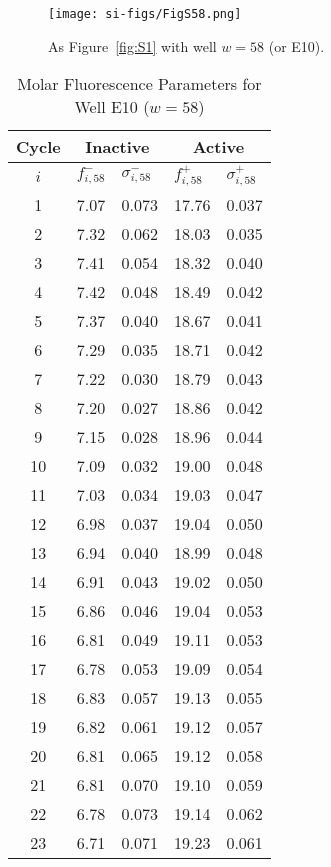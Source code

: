                 \begin{figure}
                    \centering
                    \texttt{[image: si-figs/FigS58.png]}
                    \caption{
                        As Figure~\ref{fig:S1} with well $w=58$ (or E10).
                    }
                \end{figure}
                \clearpage
    \begin{table}
        \caption{Molar Fluorescence Parameters for Well E10 ($w=58$)}
        \centering
        \begin{tabular}{c|ll|ll}
            Cycle & \multicolumn{2}{c|}{Inactive} & \multicolumn{2}{c}{Active} \\
            \hline
            $i$ & $f_{i,58}^{-}$ & $\sigma_{i,58}^{-}$ &  $f_{i,58}^{+}$ & $\sigma_{i,58}^{+}$ \\
            \hline
    1 & 7.07 & 0.073 & 17.76 & 0.037 \\
2 & 7.32 & 0.062 & 18.03 & 0.035 \\
3 & 7.41 & 0.054 & 18.32 & 0.040 \\
4 & 7.42 & 0.048 & 18.49 & 0.042 \\
5 & 7.37 & 0.040 & 18.67 & 0.041 \\
6 & 7.29 & 0.035 & 18.71 & 0.042 \\
7 & 7.22 & 0.030 & 18.79 & 0.043 \\
8 & 7.20 & 0.027 & 18.86 & 0.042 \\
9 & 7.15 & 0.028 & 18.96 & 0.044 \\
10 & 7.09 & 0.032 & 19.00 & 0.048 \\
11 & 7.03 & 0.034 & 19.03 & 0.047 \\
12 & 6.98 & 0.037 & 19.04 & 0.050 \\
13 & 6.94 & 0.040 & 18.99 & 0.048 \\
14 & 6.91 & 0.043 & 19.02 & 0.050 \\
15 & 6.86 & 0.046 & 19.04 & 0.053 \\
16 & 6.81 & 0.049 & 19.11 & 0.053 \\
17 & 6.78 & 0.053 & 19.09 & 0.054 \\
18 & 6.83 & 0.057 & 19.13 & 0.055 \\
19 & 6.82 & 0.061 & 19.12 & 0.057 \\
20 & 6.81 & 0.065 & 19.12 & 0.058 \\
21 & 6.81 & 0.070 & 19.10 & 0.059 \\
22 & 6.78 & 0.073 & 19.14 & 0.062 \\
23 & 6.71 & 0.071 & 19.23 & 0.061 \\

\end{tabular}
\end{table}
